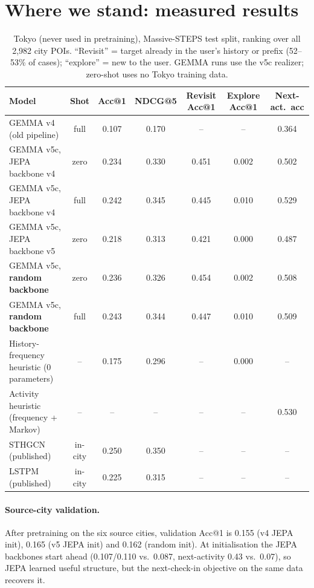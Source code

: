 \documentclass[10.5pt]{article}
\begin{document}
\section{Where we stand: measured results}\label{sec:state}
\begin{table}[h]
\centering\small
\caption{Tokyo (never used in pretraining), Massive-STEPS test split, ranking over all 2{,}982 city POIs.
``Revisit'' = target already in the user's history or prefix (52--53\% of cases); ``explore'' = new to the user.
GEMMA runs use the v5c realizer; zero-shot uses no Tokyo training data.}
\label{tab:tokyo}
\begin{tabular}{lcccccc}
\toprule
Model & Shot & Acc@1 & NDCG@5 & Revisit Acc@1 & Explore Acc@1 & Next-act.\ acc \\
\midrule
GEMMA v4 (old pipeline) & full & 0.107 & 0.170 & -- & -- & 0.364 \\
GEMMA v5c, JEPA backbone v4 & zero & 0.234 & 0.330 & 0.451 & 0.002 & 0.502 \\
GEMMA v5c, JEPA backbone v4 & full & 0.242 & 0.345 & 0.445 & 0.010 & 0.529 \\
GEMMA v5c, JEPA backbone v5 & zero & 0.218 & 0.313 & 0.421 & 0.000 & 0.487 \\
GEMMA v5c, \textbf{random backbone} & zero & 0.236 & 0.326 & 0.454 & 0.002 & 0.508 \\
GEMMA v5c, \textbf{random backbone} & full & 0.243 & 0.344 & 0.447 & 0.010 & 0.509 \\
\midrule
History-frequency heuristic (0 parameters) & -- & 0.175 & 0.296 & -- & 0.000 & -- \\
Activity heuristic (frequency + Markov) & -- & -- & -- & -- & -- & 0.530 \\
STHGCN~\cite{sthgcn} (published) & in-city & 0.250 & 0.350 & -- & -- & -- \\
LSTPM~\cite{lstpm} (published) & in-city & 0.225 & 0.315 & -- & -- & -- \\
\bottomrule
\end{tabular}
\end{table}

\paragraph{Source-city validation.} After pretraining on the six source cities, validation Acc@1 is 0.155 (v4 JEPA
init), 0.165 (v5 JEPA init) and 0.162 (random init). At initialisation the JEPA backbones start ahead (0.107/0.110 vs.\
0.087, next-activity 0.43 vs.\ 0.07), so JEPA learned useful structure, but the next-check-in objective on the same data
recovers it.
\end{document}
